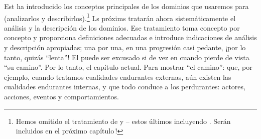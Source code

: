 \begynd
\pind Est  ha introducido \nyl los conceptos principales de los dominios que usaremos
      para \nyl (analizarlos y describirlos).\footnote{\LLLL Hemos
      omitido el tratamiento de  y
       -- estos últimos incluyendo . Serán
      incluidos en el próximo capítulo\,!}
\pind Ls próxims  tratarán ahora sistemáticamente \nyl el
      análisis y la descripción de los dominios.
\begynd
\pind Ese tratamiento toma concepto por concepto y
\begynd
\pind proporciona definiciones adecuadas e
\pind introduce indicaciones de análisis y descripción apropiadas;
\pind una por una, en una progresión casi pedante,
\pind ¡por lo tanto, quizás ``lenta''!
\afslut
\afslut
\mnewfoil
\pind El  puede ser excusado
\begynd
\pind si de vez en cuando pierde de vista ``su camino''.
\afslut
\pind Por lo tanto, el capítulo actual.
\begynd
\pind Para mostrar ``el camino'':
\pind que, por ejemplo, \nyl cuando tratamos cualidades endurantes externas,
\pind aún existen las cualidades endurantes internas,
\pind y que todo conduce a los perdurantes:
\begynd
\pind actores,
\pind acciones,
\pind eventos y
\pind comportamientos.
\afslut
\afslut
\afslut

\label{chap2.tex.Preview.n}
